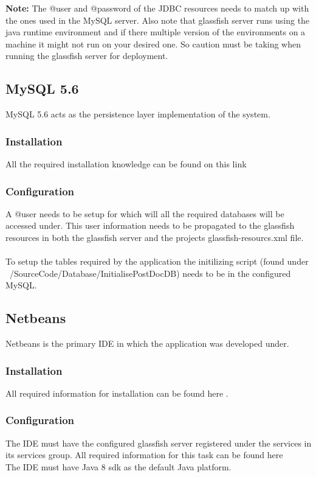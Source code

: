 \documentclass[12pt]{article}
\begin{document}
\textbf{Note:} The @user and @password of the JDBC resources needs to match up with the ones used in the MySQL server. Also note that glassfish server runs using the java runtime environment and if there multiple version of the environments on a machine it might not run on your desired one. So caution must be taking when running the glassfish server for deployment.\\
\subsection{MySQL 5.6}
MySQL 5.6 acts as the persistence layer implementation of the system.

\subsubsection{Installation}
All the required installation knowledge can be found on this link \textbf{} 

\subsubsection{Configuration}
A @user needs to be setup for which will all the required databases will be accessed under. This user information needs to be propagated to the glassfish resources in both the glassfish server and the projects glassfish-resourcs.xml file.
\\
\\
To setup the tables required by the application the initilizing script (found under ~/SourceCode/Database/InitialisePostDocDB) needs to be in the configured MySQL.

\subsection{Netbeans} 
Netbeans is the primary IDE in which the application was developed under.

\subsubsection{Installation}
All required information for installation can be found here \textbf{}.

\subsubsection{Configuration}
The IDE must have the configured glassfish server registered under the services in its services group. All required information for this task can be found here \textbf{}
\\
The IDE must have Java 8 sdk as the default Java platform.
\end{document}
